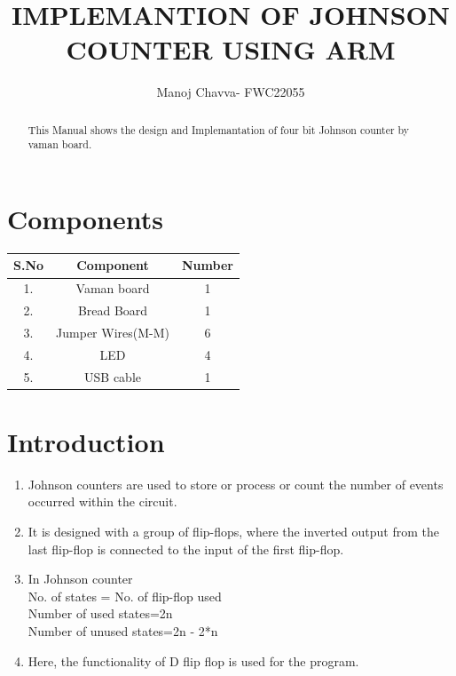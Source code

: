 \documentclass[journal,12pt,twocolumn]{IEEEtran}
\title{IMPLEMANTION OF JOHNSON COUNTER USING ARM}
\author{Manoj Chavva- FWC22055}
\begin{document}
\maketitle

\tableofcontents
\vspace{0.5cm}
\begin{abstract}
  This Manual shows the design and Implemantation of four bit Johnson counter by vaman board.
\end{abstract}    
\section{Components}     
\begin{tabular}{|c|c|c|}
    \hline 
      \textbf{S.No} & \textbf{Component} & \textbf{Number}\\
      \hline
	1. & Vaman board & 1 \\
	2. & Bread Board & 1 \\
	3. & Jumper Wires(M-M) & 6 \\
	4. & LED & 4 \\
	5. & USB cable & 1 \\
	
      \hline
      
   \end{tabular}
     \vspace{0.35cm}


\section{Introduction}
\begin{enumerate}
  \item Johnson counters are used to store or process or count the number of events occurred within the circuit.
  \item It is designed with a group of flip-flops, where the inverted output from the last flip-flop is connected to the input of the first flip-flop.
  \item In Johnson counter
  \\No. of states = No. of flip-flop used  
\\Number of used states=2n  
\\Number of unused states=2n - 2*n  
\item Here, the functionality of D flip flop is used for the program. 
\end{enumerate}

    \vspace{2.5cm}   
\end{document}
